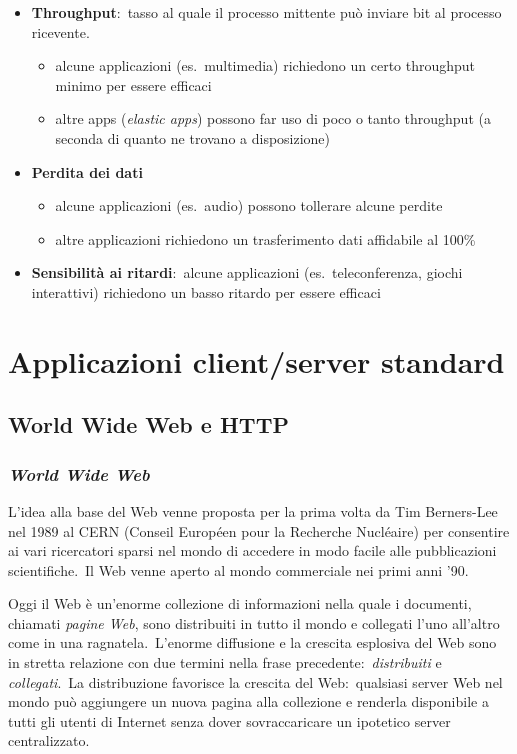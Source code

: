 \begin{itemize}
    \item \textbf{Throughput}:\ tasso al quale il processo mittente può inviare bit al processo ricevente.
          \begin{itemize}
              \item alcune applicazioni (es.\ multimedia) richiedono un certo throughput minimo per essere efficaci
              \item altre apps (\emph{elastic apps}) possono far uso di poco o tanto throughput (a seconda di quanto ne trovano a disposizione)
          \end{itemize}
    \item \textbf{Perdita dei dati}
          \begin{itemize}
              \item alcune applicazioni (es.\ audio) possono tollerare alcune perdite
              \item altre applicazioni richiedono un trasferimento dati affidabile al 100\%
          \end{itemize}
    \item \textbf{Sensibilità ai ritardi}:\ alcune applicazioni (es.\ teleconferenza, giochi interattivi) richiedono un basso ritardo per essere efficaci
\end{itemize}

\section{Applicazioni client/server standard}

\subsection{World Wide Web e HTTP}

\subsubsection{\emph{World Wide Web}}

L'idea alla base del Web venne proposta per la prima volta da Tim Berners-Lee nel 1989 al CERN (Conseil Européen pour la Recherche Nucléaire) per consentire ai vari ricercatori sparsi nel mondo di accedere in modo facile alle pubblicazioni scientifiche.\
Il Web venne aperto al mondo commerciale nei primi anni '90.

Oggi il Web è un'enorme collezione di informazioni nella quale i documenti, chiamati \emph{pagine Web}, sono distribuiti in tutto il mondo e collegati l'uno all'altro come in una ragnatela.\
L'enorme diffusione e la crescita esplosiva del Web sono in stretta relazione con due termini nella frase precedente:\ \emph{distribuiti} e \emph{collegati}.\
La distribuzione favorisce la crescita del Web:\ qualsiasi server Web nel mondo può aggiungere un nuova pagina alla collezione e renderla disponibile a tutti gli utenti di Internet senza dover sovraccaricare un ipotetico server centralizzato.

